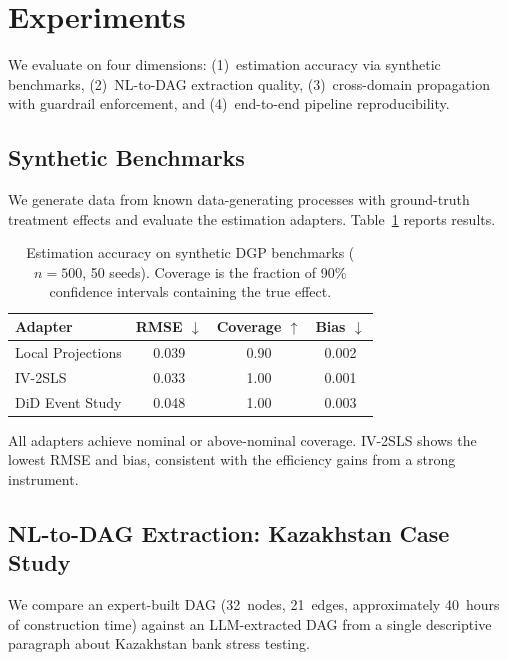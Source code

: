 \documentclass{article}
\begin{document}
\section{Experiments}
\label{sec:experiments}

We evaluate \oc{} on four dimensions: (1)~estimation accuracy via synthetic benchmarks, (2)~NL-to-DAG extraction quality, (3)~cross-domain propagation with guardrail enforcement, and (4)~end-to-end pipeline reproducibility.

\subsection{Synthetic Benchmarks}

We generate data from known data-generating processes with ground-truth treatment effects and evaluate the estimation adapters. Table~\ref{tab:benchmarks} reports results.

\begin{table}[t]
\centering
\caption{Estimation accuracy on synthetic DGP benchmarks ($n=500$, 50 seeds). Coverage is the fraction of 90\% confidence intervals containing the true effect.}
\label{tab:benchmarks}
\small
\begin{tabular}{@{}lccc@{}}
\toprule
\textbf{Adapter} & \textbf{RMSE} $\downarrow$ & \textbf{Coverage} $\uparrow$ & \textbf{Bias} $\downarrow$ \\
\midrule
Local Projections & 0.039 & 0.90 & 0.002 \\
IV-2SLS & 0.033 & 1.00 & 0.001 \\
DiD Event Study & 0.048 & 1.00 & 0.003 \\
\bottomrule
\end{tabular}
\end{table}

All adapters achieve nominal or above-nominal coverage. IV-2SLS shows the lowest RMSE and bias, consistent with the efficiency gains from a strong instrument.

\subsection{NL-to-DAG Extraction: Kazakhstan Case Study}

We compare an expert-built DAG (32~nodes, 21~edges, approximately 40~hours of construction time) against an LLM-extracted DAG from a single descriptive paragraph about Kazakhstan bank stress testing.
\end{document}
